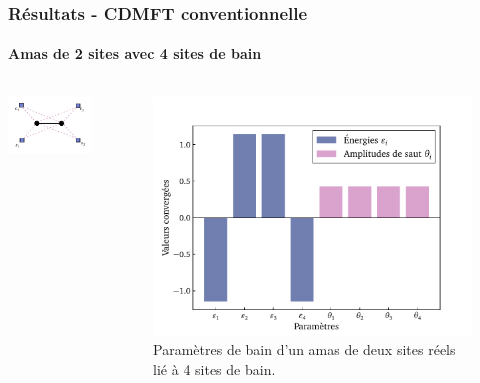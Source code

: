 \begin{frame}
    \frametitle{Résultats - CDMFT conventionnelle}
    \framesubtitle{Amas de 2 sites avec 4 sites de bain}
    \begin{columns}
        \centering
        \includegraphics[scale=1.1]{figures/results/clusters/1D_2s_4b_cluster.pdf}
        \begin{figure}
            \includegraphics[scale=0.45]{figures/results/graphs/1D_2s_4b.pdf}
            \caption{Paramètres de bain d'un amas de deux sites réels lié à 4 sites de bain.}
            \label{fig: simu_2s_4b}
        \end{figure}
    \end{columns}
\end{frame}

